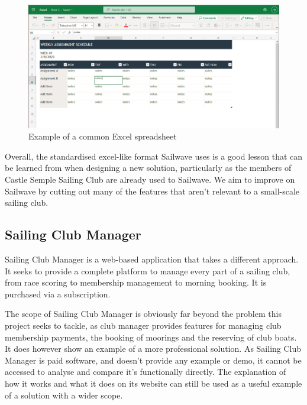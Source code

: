 \documentclass{l4proj}
\begin{document}
\begin{figure}[H]
    \centering
    \includegraphics[width=1\linewidth]{images/Ecel.png} 

    \caption{Example of a common Excel spreadsheet \citep{Excel}
    }

    \label{fig:Excel} 
\end{figure}

Overall, the standardised excel-like format Sailwave uses is a good lesson that can be learned from when designing a new solution, particularly as the members of Castle Semple Sailing Club are already used to Sailwave. We aim to improve on Sailwave by cutting out many of the features that aren't relevant to a small-scale sailing club.

\subsection{Sailing Club Manager}
Sailing Club Manager is a web-based application that takes a different approach. It seeks to provide a complete platform to manage every part of a sailing club, from race scoring to membership management to morning booking. It is purchased via a subscription. \citep{ClubManager}

The scope of Sailing Club Manager is obviously far beyond the problem this project seeks to tackle, as club manager provides features for managing club membership payments, the booking of moorings and the reserving of club boats. It does however show an example of a more professional solution. As Sailing Club Manager is paid software, and doesn't provide any example or demo, it cannot be accessed to analyse and compare it's functionally directly. The explanation of how it works and what it does on its website can still be used as a useful example of a solution with a wider scope.
\end{document}

